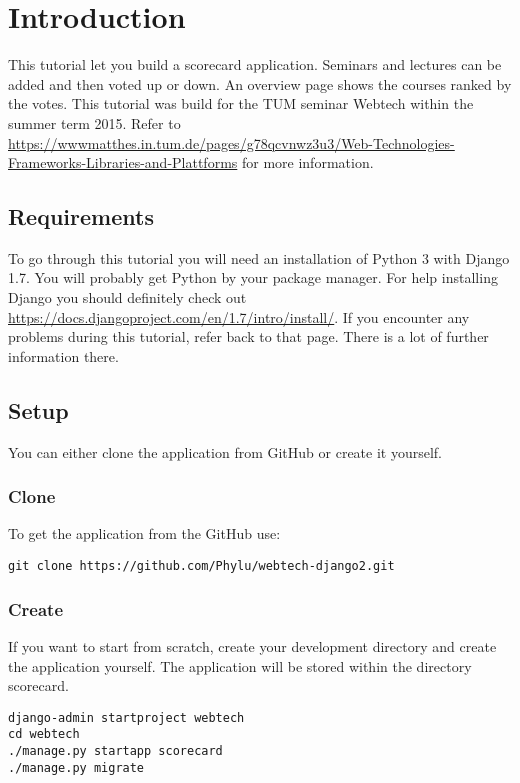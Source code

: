 \section{Introduction}

This tutorial let you build a scorecard application. Seminars and lectures can be added and then voted up or down. An overview page shows the courses ranked by the votes. This tutorial was build for the TUM seminar Webtech within the summer term 2015. Refer to \url{https://wwwmatthes.in.tum.de/pages/g78qcvnwz3u3/Web-Technologies-Frameworks-Libraries-and-Plattforms} for more information.

\subsection{Requirements}

To go through this tutorial you will need an installation of Python 3 with Django 1.7. You will probably get Python by your package manager. For help installing Django you should definitely check out \url{https://docs.djangoproject.com/en/1.7/intro/install/}. If you encounter any problems during this tutorial, refer back to that page. There is a lot of further information there.

\subsection{Setup}
You can either clone the application from GitHub or create it yourself.

\subsubsection{Clone}
To get the application from the GitHub use:
\begin{lstlisting}[style=Bash, caption=Clone application, label=lst:clone_app]
git clone https://github.com/Phylu/webtech-django2.git
\end{lstlisting}

\subsubsection{Create}
If you want to start from scratch, create your development directory and create the application yourself. The application will be stored within the directory scorecard.
\begin{lstlisting}[style=Bash, caption=Create application, label=lst:create_app]
django-admin startproject webtech
cd webtech
./manage.py startapp scorecard
./manage.py migrate
\end{lstlisting}

